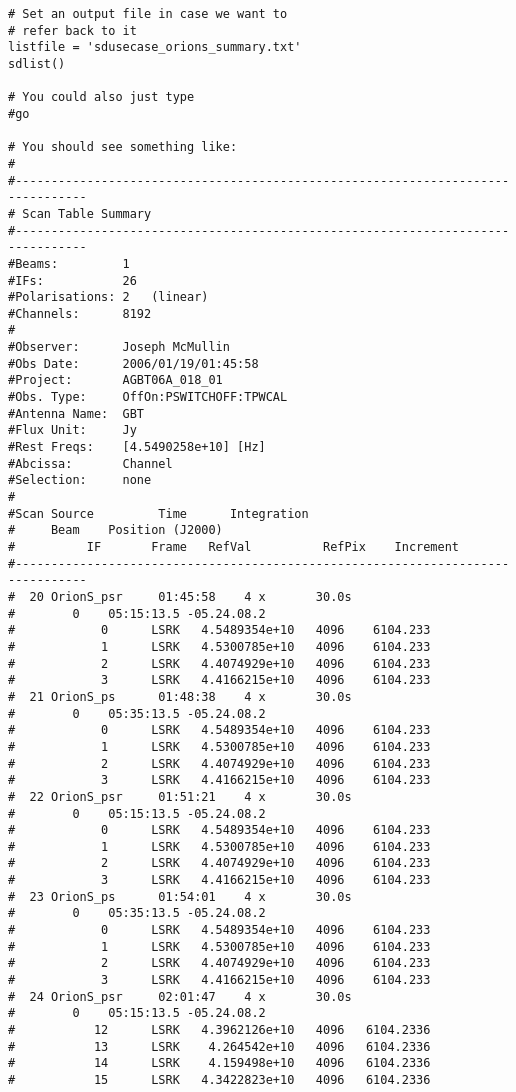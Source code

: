 \begin{verbatim}
# Set an output file in case we want to
# refer back to it
listfile = 'sdusecase_orions_summary.txt'
sdlist()

# You could also just type
#go

# You should see something like:
#
#--------------------------------------------------------------------------------
# Scan Table Summary
#--------------------------------------------------------------------------------
#Beams:         1   
#IFs:           26  
#Polarisations: 2   (linear)
#Channels:      8192
#
#Observer:      Joseph McMullin
#Obs Date:      2006/01/19/01:45:58
#Project:       AGBT06A_018_01
#Obs. Type:     OffOn:PSWITCHOFF:TPWCAL
#Antenna Name:  GBT
#Flux Unit:     Jy
#Rest Freqs:    [4.5490258e+10] [Hz]
#Abcissa:       Channel
#Selection:     none
#
#Scan Source         Time      Integration       
#     Beam    Position (J2000)
#          IF       Frame   RefVal          RefPix    Increment   
#--------------------------------------------------------------------------------
#  20 OrionS_psr     01:45:58    4 x       30.0s
#        0    05:15:13.5 -05.24.08.2
#            0      LSRK   4.5489354e+10   4096    6104.233
#            1      LSRK   4.5300785e+10   4096    6104.233
#            2      LSRK   4.4074929e+10   4096    6104.233
#            3      LSRK   4.4166215e+10   4096    6104.233
#  21 OrionS_ps      01:48:38    4 x       30.0s
#        0    05:35:13.5 -05.24.08.2
#            0      LSRK   4.5489354e+10   4096    6104.233
#            1      LSRK   4.5300785e+10   4096    6104.233
#            2      LSRK   4.4074929e+10   4096    6104.233
#            3      LSRK   4.4166215e+10   4096    6104.233
#  22 OrionS_psr     01:51:21    4 x       30.0s
#        0    05:15:13.5 -05.24.08.2
#            0      LSRK   4.5489354e+10   4096    6104.233
#            1      LSRK   4.5300785e+10   4096    6104.233
#            2      LSRK   4.4074929e+10   4096    6104.233
#            3      LSRK   4.4166215e+10   4096    6104.233
#  23 OrionS_ps      01:54:01    4 x       30.0s
#        0    05:35:13.5 -05.24.08.2
#            0      LSRK   4.5489354e+10   4096    6104.233
#            1      LSRK   4.5300785e+10   4096    6104.233
#            2      LSRK   4.4074929e+10   4096    6104.233
#            3      LSRK   4.4166215e+10   4096    6104.233
#  24 OrionS_psr     02:01:47    4 x       30.0s
#        0    05:15:13.5 -05.24.08.2
#           12      LSRK   4.3962126e+10   4096   6104.2336
#           13      LSRK    4.264542e+10   4096   6104.2336
#           14      LSRK    4.159498e+10   4096   6104.2336
#           15      LSRK   4.3422823e+10   4096   6104.2336

\end{verbatim}
